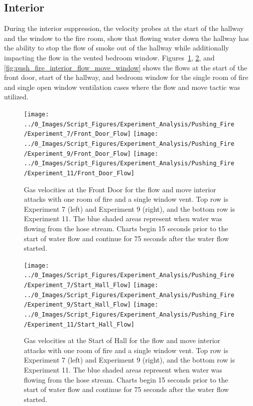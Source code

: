 \documentclass[12pt,oneside]{book}
\begin{document}
\subsection{Interior}
During the interior suppression, the velocity probes at the start of the hallway and the window to the fire room, show that flowing water down the hallway has the ability to stop the flow of smoke out of the hallway while additionally impacting the flow in the vented bedroom window. Figures~\ref{fig:push_fire_interior_flow_move_front_door}, \ref{fig:push_fire_interior_flow_move_hall}, and \ref{fig:push_fire_interior_flow_move_window} shows the flows at the start of the front door, start of the hallway, and bedroom window for the single room of fire and single open window ventilation cases where the flow and move tactic was utilized.   
{}
\begin{figure}[H]
\centering
\texttt{[image: ../0\_Images/Script\_Figures/Experiment\_Analysis/Pushing\_Fire/Experiment\_7/Front\_Door\_Flow]}
\texttt{[image: ../0\_Images/Script\_Figures/Experiment\_Analysis/Pushing\_Fire/Experiment\_9/Front\_Door\_Flow]}{}
\texttt{[image: ../0\_Images/Script\_Figures/Experiment\_Analysis/Pushing\_Fire/Experiment\_11/Front\_Door\_Flow]}
\caption[Gas Velocities - Single Room of Fire - Interior - Flow and Move]{Gas velocities at the Front Door for the flow and move interior attacks with one room of fire and a single window vent. Top row is Experiment 7 (left) and Experiment 9 (right), and the bottom row is Experiment 11. The blue shaded areas represent when water was flowing from the hose stream. Charts begin 15 seconds prior to the start of water flow and continue for 75 seconds after the water flow started.}
\label{fig:push_fire_interior_flow_move_front_door}
\end{figure}

\begin{figure}[H]
\centering
\texttt{[image: ../0\_Images/Script\_Figures/Experiment\_Analysis/Pushing\_Fire/Experiment\_7/Start\_Hall\_Flow]}
\texttt{[image: ../0\_Images/Script\_Figures/Experiment\_Analysis/Pushing\_Fire/Experiment\_9/Start\_Hall\_Flow]}
\texttt{[image: ../0\_Images/Script\_Figures/Experiment\_Analysis/Pushing\_Fire/Experiment\_11/Start\_Hall\_Flow]}
\caption[Gas Velocities - Single Room of Fire - Interior - Flow and Move]{Gas velocities at the Start of Hall for the flow and move interior attacks with one room of fire and a single window vent. Top row is Experiment 7 (left) and Experiment 9 (right), and the bottom row is Experiment 11. The blue shaded areas represent when water was flowing from the hose stream. Charts begin 15 seconds prior to the start of water flow and continue for 75 seconds after the water flow started.}
\label{fig:push_fire_interior_flow_move_hall}
\end{figure}
\end{document}
